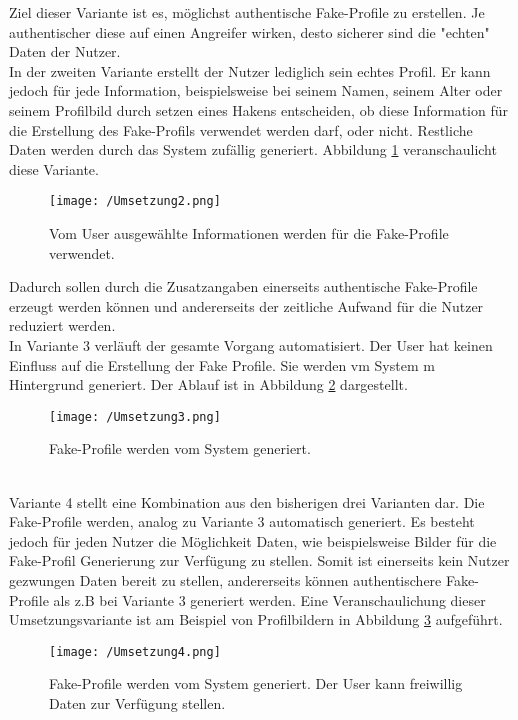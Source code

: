 \documentclass{sigchi}
\begin{document}
Ziel dieser Variante ist es, möglichst authentische Fake-Profile zu erstellen. Je authentischer diese auf einen Angreifer wirken, desto sicherer sind die "echten" Daten der Nutzer. \\
In der zweiten Variante erstellt der Nutzer lediglich sein echtes Profil. Er kann jedoch für jede Information, beispielsweise bei seinem Namen, seinem Alter oder seinem Profilbild durch setzen eines Hakens entscheiden, ob diese Information für die Erstellung des Fake-Profils verwendet werden darf, oder nicht. Restliche Daten werden durch das System zufällig generiert. Abbildung \ref{fig:Umsetzung2} veranschaulicht diese Variante. 
\begin{figure}[htbp]
	\texttt{[image: /Umsetzung2.png]}
	\caption{Vom User ausgewählte Informationen werden für die Fake-Profile verwendet.}
	\label{fig:Umsetzung2}
\end{figure}
Dadurch sollen durch die Zusatzangaben einerseits authentische Fake-Profile erzeugt werden können und andererseits der zeitliche Aufwand für die Nutzer reduziert werden. \\
In Variante 3 verläuft der gesamte Vorgang automatisiert. Der User hat keinen Einfluss auf die Erstellung der Fake Profile. Sie werden vm System m Hintergrund generiert. Der Ablauf ist in Abbildung \ref{fig:Umsetzung3} dargestellt.
\begin{figure}[htbp]
	\texttt{[image: /Umsetzung3.png]}
	\caption{Fake-Profile werden vom System generiert.}
	\label{fig:Umsetzung3}
\end{figure}
\\
Variante 4 stellt eine Kombination aus den bisherigen drei Varianten dar. Die Fake-Profile werden, analog zu Variante 3 automatisch generiert. Es besteht jedoch für jeden Nutzer die Möglichkeit Daten, wie beispielsweise Bilder für die Fake-Profil Generierung zur Verfügung zu stellen. Somit ist einerseits kein Nutzer gezwungen Daten bereit zu stellen, andererseits können authentischere Fake-Profile als z.B bei Variante 3 generiert werden. Eine Veranschaulichung dieser Umsetzungsvariante ist am Beispiel von Profilbildern in Abbildung \ref{fig:Umsetzung4} aufgeführt. 
\begin{figure}[htbp]
	\texttt{[image: /Umsetzung4.png]}
	\caption{Fake-Profile werden vom System generiert. Der User kann freiwillig Daten zur Verfügung stellen.}
	\label{fig:Umsetzung4}
\end{figure}
\end{document}
